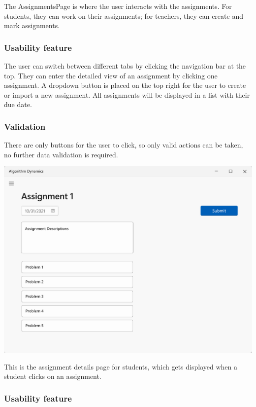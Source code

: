 \documentclass[a4paper]{report}
\begin{document}
The AssignmentsPage is where the user interacts with the assignments. For students, they can work on their assignments; for teachers, they can create and mark assignments.

\subsubsection{Usability feature}

The user can switch between different tabs by clicking the navigation bar at the top. They can enter the detailed view of an assignment by clicking one assignment. A dropdown button is placed on the top right for the user to create or import a new assignment. All assignments will be displayed in a list with their due date.

\subsubsection{Validation}

There are only buttons for the user to click, so only valid actions can be taken, no further data validation is required.

\includegraphics[width=\textwidth, height=\textheight, keepaspectratio]{AssignmentsStudentDetailsPage-design}

This is the assignment details page for students, which gets displayed when a student clicks on an assignment.

\subsubsection{Usability feature}
\end{document}
